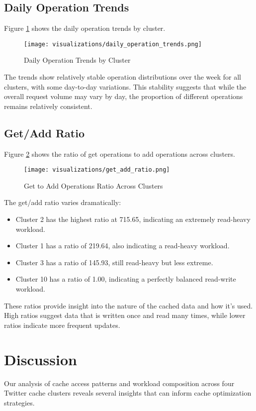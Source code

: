 \documentclass[conference]{IEEEtran}
\begin{document}
\subsection{Daily Operation Trends}
Figure \ref{fig:daily_operation} shows the daily operation trends by cluster.

\begin{figure}[htbp]
    \centering
    \texttt{[image: visualizations/daily\_operation\_trends.png]}
    \caption{Daily Operation Trends by Cluster}
    \label{fig:daily_operation}
\end{figure}

The trends show relatively stable operation distributions over the week for all clusters, with some day-to-day variations. This stability suggests that while the overall request volume may vary by day, the proportion of different operations remains relatively consistent.

\subsection{Get/Add Ratio}
Figure \ref{fig:get_add_ratio} shows the ratio of get operations to add operations across clusters.

\begin{figure}[htbp]
    \centering
    \texttt{[image: visualizations/get\_add\_ratio.png]}
    \caption{Get to Add Operations Ratio Across Clusters}
    \label{fig:get_add_ratio}
\end{figure}

The get/add ratio varies dramatically:
\begin{itemize}
    \item Cluster 2 has the highest ratio at 715.65, indicating an extremely read-heavy workload.
    \item Cluster 1 has a ratio of 219.64, also indicating a read-heavy workload.
    \item Cluster 3 has a ratio of 145.93, still read-heavy but less extreme.
    \item Cluster 10 has a ratio of 1.00, indicating a perfectly balanced read-write workload.
\end{itemize}

These ratios provide insight into the nature of the cached data and how it's used. High ratios suggest data that is written once and read many times, while lower ratios indicate more frequent updates.

\section{Discussion}
Our analysis of cache access patterns and workload composition across four Twitter cache clusters reveals several insights that can inform cache optimization strategies.
\end{document}
